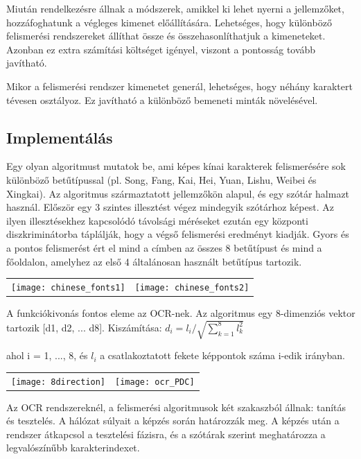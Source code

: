 Miután rendelkezésre állnak a módszerek, amikkel ki lehet nyerni a jellemzőket, hozzáfoghatunk a végleges kimenet előállítására. Lehetséges, hogy különböző felismerési rendszereket állíthat össze és összehasonlíthatjuk a kimeneteket. Azonban ez extra számítási költséget igényel, viszont a pontosság tovább javítható.

Mikor a felismerési rendszer kimenetet generál, lehetséges, hogy néhány karaktert tévesen osztályoz. Ez javítható a különböző bemeneti minták növelésével.

\subsection{Implementálás}

Egy olyan algoritmust mutatok be, ami képes kínai karakterek felismerésére sok különböző betűtípussal (pl. Song, Fang, Kai, Hei, Yuan, Lishu, Weibei és Xingkai). Az algoritmus származtatott jellemzőkön alapul, és egy szótár halmazt használ. Először egy 3 szintes illesztést végez mindegyik szótárhoz képest. Az ilyen illesztésekhez kapcsolódó távolsági méréseket ezután egy központi diszkriminátorba táplálják, hogy a végső felismerési eredményt kiadják. Gyors és a pontos felismerést ért el mind a címben az összes 8 betűtípust és mind a főoldalon, amelyhez az első 4 általánosan használt betűtípus tartozik.

\begin{tabular}{ c c }
\texttt{[image: chinese\_fonts1]} & \texttt{[image: chinese\_fonts2]}
\end{tabular}

A funkciókivonás fontos eleme az OCR-nek. Az algoritmus egy 8-dimenziós vektor tartozik [d1, d2, ... d8]. Kiszámítása: \( d_i = l_i / \sqrt{\sum_{k=1}^8 l_k^2} \)

ahol i = 1, ..., 8, és $l_i$ a csatlakoztatott fekete képpontok száma i-edik irányban.

\begin{center}
\begin{tabular}{ c c }
\texttt{[image: 8direction]} & \texttt{[image: ocr\_PDC]}
\end{tabular}
\end{center}

Az OCR rendszereknél, a felismerési algoritmusok két szakaszból állnak: tanítás és tesztelés. A hálózat súlyait a képzés során határozzák meg. A képzés után a rendszer átkapcsol a tesztelési fázisra, és a szótárak szerint meghatározza a legvalószínűbb karakterindexet.


